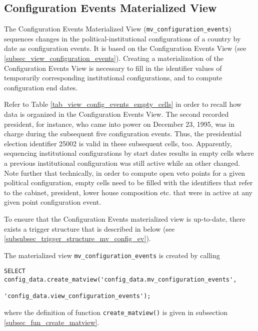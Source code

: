 \subsection{Configuration Events Materialized View}\label{subsec_mview_configuration_events}

The Configuration Events Materialized View (\texttt{mv\_configuration\_events}) sequences changes in the political-institutional configurations of a country by date as configuration events.
It is based on the  Configuration Events View (see \ref{subsec_view_configuration_events}).
Creating a materialization of the Configuration Events View is necessary to fill in the identifier values of temporarily corresponding institutional configurations, and to compute configuration end dates.

Refer to Table \ref{tab_view_config_events_empty_cells} in order to recall how data is organized in the Configuration Events View.
The second recorded president, for instance, who came into power on December 23, 1995, was in charge during the subsequent five configuration events. 
Thus, the presidential election identifier 25002 is valid in these subsequent cells, too.
Apparently, sequencing institutional configurations by start dates results in empty cells where a previous institutional configuration was still active while an other changed. 
Note further that technically, in order to compute open veto points for a given political configuration, empty cells need to be filled with the identifiers that refer to the cabinet, president, lower house composition etc. that were in active at any given point configuration event.

To ensure that the Configuration Events materialized view is up-to-date, there exists a trigger structure that is described in below (see \ref{subsubsec_trigger_structure_mv_config_ev}).

The materialized view \texttt{mv\_configuration\_events} is created by calling  
\begin{lstlisting}[language=postgreSQL]
SELECT config_data.create_matview('config_data.mv_configuration_events', 
                                  'config_data.view_configuration_events');
\end{lstlisting}
where the definition of function \texttt{create\_matview()} is given in subsection \ref{subsec_fun_create_matview}.

